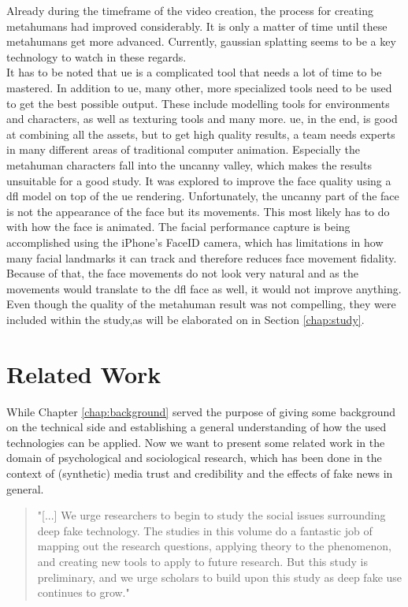 \documentclass[
  a4paper,  %
  twoside,  %
  bibliography=totoc,
  headsepline,
  cleardoublepage=empty,
  parskip=half,
  draft=false
]{scrbook}
\begin{document}
Already during the timeframe of the video creation, the process for creating metahumans had improved considerably. It is only a matter of time until these metahumans get more advanced. Currently, gaussian splatting seems to be a key technology to watch in these regards. \\
It has to be noted that \gls{ue} is a complicated tool that needs a lot of time to be mastered. In addition to \gls{ue}, many other, more specialized tools need to be used to get the best possible output. These include modelling tools for environments and characters, as well as texturing tools and many more. \gls{ue}, in the end, is good at combining all the assets, but to get high quality results, a team needs experts in many different areas of traditional computer animation. Especially the metahuman characters fall into the uncanny valley, which makes the results unsuitable for a good study. It was explored to improve the face quality using a \gls{dfl} model on top of the \gls{ue} rendering. Unfortunately, the uncanny part of the face is not the appearance of the face but its movements. This most likely has to do with how the face is animated. The facial performance capture is being accomplished using the iPhone's FaceID camera, which has limitations in how many facial landmarks it can track and therefore reduces face movement fidality. Because of that, the face movements do not look very natural and as the movements would translate to the \gls{dfl} face as well, it would not improve anything. \\
Even though the quality of the metahuman result was not compelling, they were included  within the study,as will be elaborated on in Section \ref{chap:study}. 

\chapter{Related Work}
\label{chap:rel-work}
While Chapter \ref{chap:background} served the purpose of giving some background on the technical side and establishing a general understanding of how the used technologies can be applied. Now we want to present some related work in the domain of psychological and sociological research, which has been done in the context of (synthetic) media trust and credibility and the effects of fake news in general. 

\begin{quotation}
  "[...] We urge researchers to begin to study the social issues surrounding deep fake technology. The studies in this volume do a fantastic job of mapping out the research questions, applying theory to the phenomenon, and creating new tools to apply to future research. But this study is preliminary, and we urge scholars to build upon this study as deep fake use continues to grow." \cite{hancockSocialImpactDeepfakes2021}
\end{quotation}
\end{document}
